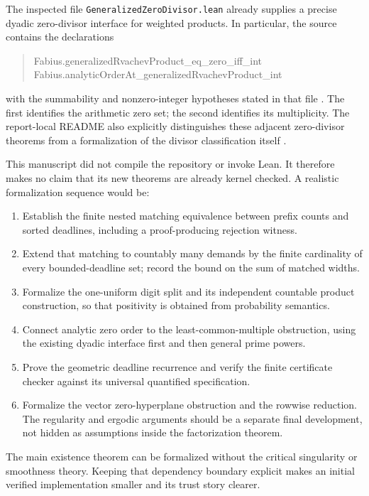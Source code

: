 \documentclass[11pt,a4paper]{article}
\theoremstyle{remark}
\newcommand{\pathtext}[1]{\nolinkurl{#1}}
\begin{document}
The inspected file \pathtext{GeneralizedZeroDivisor.lean} already supplies a
precise dyadic zero-divisor interface for weighted products. In particular,
the source contains the declarations
\begin{quote}\small\ttfamily
Fabius.generalizedRvachevProduct\_eq\_zero\_iff\_int\\
Fabius.analyticOrderAt\_generalizedRvachevProduct\_int
\end{quote}
with the summability and nonzero-integer hypotheses stated in that file
\cite{RepoLean}. The first identifies the arithmetic zero set; the second
identifies its multiplicity. The report-local README also explicitly distinguishes
these adjacent zero-divisor theorems from a formalization of the divisor
classification itself \cite{RepoDivisorsReadme}.

This manuscript did not compile the repository or invoke Lean. It therefore
makes no claim that its new theorems are already kernel checked. A realistic
formalization sequence would be:
\begin{enumerate}
\item Establish the finite nested matching equivalence between prefix counts
and sorted deadlines, including a proof-producing rejection witness.
\item Extend that matching to countably many demands by the finite cardinality
of every bounded-deadline set; record the bound on the sum of matched widths.
\item Formalize the one-uniform digit split and its independent countable
product construction, so that positivity is obtained from probability semantics.
\item Connect analytic zero order to the least-common-multiple obstruction,
using the existing dyadic interface first and then general prime powers.
\item Prove the geometric deadline recurrence and verify the finite certificate
checker against its universal quantified specification.
\item Formalize the vector zero-hyperplane obstruction and the rowwise reduction.
The regularity and ergodic arguments should be a separate final development,
not hidden as assumptions inside the factorization theorem.
\end{enumerate}
The main existence theorem can be formalized without the critical singularity
or smoothness theory. Keeping that dependency boundary explicit makes an initial
verified implementation smaller and its trust story clearer.
\end{document}
